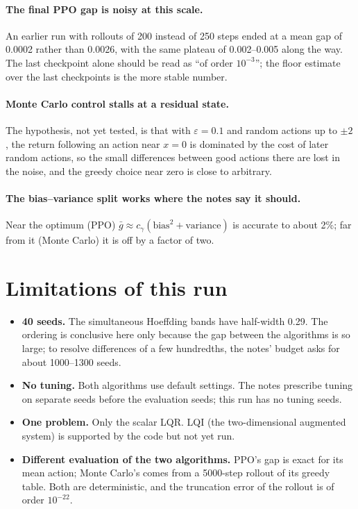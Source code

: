 \documentclass[11pt]{article}
\begin{document}
\paragraph{The final PPO gap is noisy at this scale.} An earlier run with rollouts of 200 instead of
250 steps ended at a mean gap of 0.0002 rather than 0.0026, with the same plateau of 0.002--0.005
along the way. The last checkpoint alone should be read as ``of order $10^{-3}$''; the floor
estimate over the last checkpoints is the more stable number.

\paragraph{Monte Carlo control stalls at a residual state.} The hypothesis, not yet tested, is that
with $\varepsilon = 0.1$ and random actions up to $\pm 2$, the return following an action near
$x = 0$ is dominated by the cost of later random actions, so the small differences between good
actions there are lost in the noise, and the greedy choice near zero is close to arbitrary.

\paragraph{The bias--variance split works where the notes say it should.} Near the optimum (PPO)
$\bar g \approx c_\gamma(\text{bias}^2 + \text{variance})$ is accurate to about 2\%; far from it
(Monte Carlo) it is off by a factor of two.

\section{Limitations of this run}

\begin{itemize}[leftmargin=*]
  \item \textbf{40 seeds.} The simultaneous Hoeffding bands have half-width 0.29. The ordering is
    conclusive here only because the gap between the algorithms is so large; to resolve
    differences of a few hundredths, the notes' budget asks for about 1000--1300 seeds.
  \item \textbf{No tuning.} Both algorithms use default settings. The notes prescribe tuning on
    separate seeds before the evaluation seeds; this run has no tuning seeds.
  \item \textbf{One problem.} Only the scalar LQR. LQI (the two-dimensional augmented system) is
    supported by the code but not yet run.
  \item \textbf{Different evaluation of the two algorithms.} PPO's gap is exact for its mean
    action; Monte Carlo's comes from a 5000-step rollout of its greedy table. Both are
    deterministic, and the truncation error of the rollout is of order $10^{-22}$.
\end{itemize}
\end{document}
